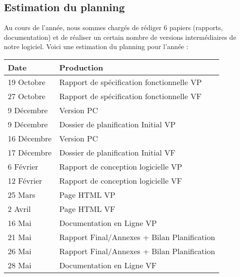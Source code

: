 \subsection{Estimation du planning}
Au cours de l'année, nous sommes chargés de rédiger 6 papiers (rapports, documentation) et de réaliser un certain nombre de versions intermédiaires de notre logiciel.
Voici une estimation du planning pour l'année :
\\
\begin{tabular}{|l|l|}
\hline
  Date &
  Production \\
\hline
  19 Octobre &
  Rapport de spécification fonctionnelle VP \\
\hline
  27 Octobre &
  Rapport de spécification fonctionnelle VF \\
\hline
  9 Décembre &
  Version PC \textnumero1 \\
\hline
  9 Décembre &
  Dossier de planification Initial VP \\
\hline
  16 Décembre &
  Version PC \textnumero2 \\
\hline
  17 Décembre &
  Dossier de planification Initial VF \\
\hline
  6 Février &
  Rapport de conception logicielle VP \\
\hline
  12 Février &
  Rapport de conception logicielle VF \\
\hline
  25 Mars &
  Page HTML VP \\
\hline
  2 Avril &
  Page HTML VF \\
\hline
  16 Mai &
  Documentation en Ligne VP \\
\hline
  21 Mai &
  Rapport Final/Annexes + Bilan Planification \\
\hline
  26 Mai &
  Rapport Final/Annexes + Bilan Planification \\
\hline
  28 Mai &
  Documentation en Ligne VF \\
\hline
\end{tabular}

